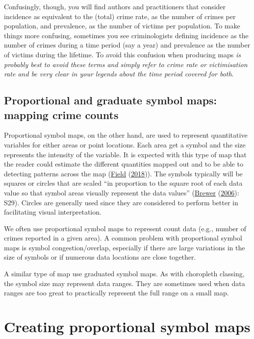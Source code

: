 \documentclass[
  krantz2]{krantz}
\begin{document}
Confusingly, though, you will find authors and practitioners that consider incidence as equivalent to the (total) crime rate, as the number of crimes per population, and prevalence, as the number of victims per population. To make things more confusing, sometimes you see criminologists defining incidence as the number of crimes during a time period (say a year) and prevalence as the number of victims during the lifetime. To avoid this confusion when producing maps \emph{is probably best to avoid these terms and simply refer to crime rate or victimisation rate and be very clear in your legends about the time period covered for both}.

\hypertarget{proportional-and-graduate-symbol-maps-mapping-crime-counts}{%
\subsection{Proportional and graduate symbol maps: mapping crime counts}\label{proportional-and-graduate-symbol-maps-mapping-crime-counts}}

Proportional symbol maps, on the other hand, are used to represent quantitative variables for either areas or point locations. Each area get a symbol and the size represents the intensity of the variable. It is expected with this type of map that the reader could estimate the different quantities mapped out and to be able to detecting patterns across the map (\protect\hyperlink{ref-Field_2018}{Field} (\protect\hyperlink{ref-Field_2018}{2018})). The symbols typically will be squares or circles that are scaled ``in proportion to the square root of each data value so that symbol areas visually represent the data values'' (\protect\hyperlink{ref-Brewer_2006}{Brewer} (\protect\hyperlink{ref-Brewer_2006}{2006}): S29). Circles are generally used since they are considered to perform better in facilitating visual interpretation.

We often use proportional symbol maps to represent count data (e.g., number of crimes reported in a given area). A common problem with proportional symbol maps is symbol congestion/overlap, especially if there are large variations in the size of symbols or if numerous data locations are close together.

A similar type of map use graduated symbol maps. As with choropleth classing, the symbol size may represent data ranges. They are sometimes used when data ranges are too great to practically represent the full range on a small map.

\hypertarget{creating-proportional-symbol-maps}{%
\section{Creating proportional symbol maps}\label{creating-proportional-symbol-maps}}
\end{document}
